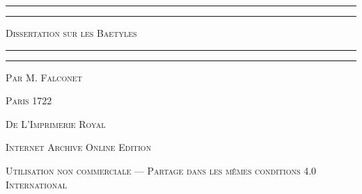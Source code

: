 \documentclass[a4paper, 11pt, oneside, polutonikogreek, french]{article}
\begin{document}
\begin{titlepage} %
	\centering %

	
	\rule{\textwidth}{1.6pt}\vspace*{-\baselineskip}\vspace*{2pt} %
	\rule{\textwidth}{0.4pt} %
	
	\vspace{1\baselineskip} %
	
	{\scshape\LARGE Dissertation sur les Baetyles}
	
	\vspace{1\baselineskip} %

	\rule{\textwidth}{0.4pt}\vspace*{-\baselineskip}\vspace{3.2pt} %
	\rule{\textwidth}{1.6pt} %
	
	\vspace{1\baselineskip} %
	
	
	{\scshape \Large Par M. Falconet} %
	
	\vspace*{1\baselineskip} %
	
        {\scshape\scriptsize } %
    
        \vspace*{\fill}

	\vspace{1\baselineskip}

	{\small\scshape Paris 1722}
	
	{\small\scshape{De L'Imprimerie Royal}}
	
	\vspace{0.5\baselineskip} %

        \scshape Internet Archive Online Edition  %
	
	{\scshape\small Utilisation non commerciale --- Partage dans les mêmes conditions 4.0 International} %
\end{titlepage}
\setlength{\parskip}{1mm plus1mm minus1mm}
\clearpage
\end{document}
